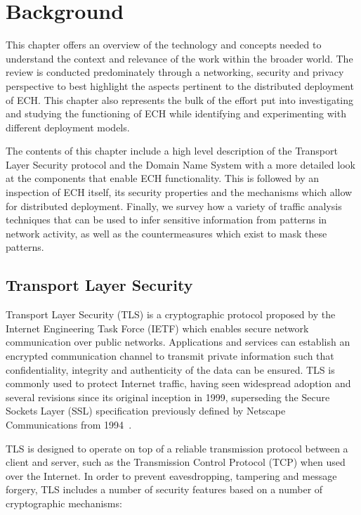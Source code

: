 \chapter{Background}\label{Background}

This chapter offers an overview of the technology and concepts needed to understand the context and relevance of the work within the broader world. The review is conducted predominately through a networking, security and privacy perspective to best highlight the aspects pertinent to the distributed deployment of ECH. This chapter also represents the bulk of the effort put into investigating and studying the functioning of ECH while identifying and experimenting with different deployment models.

The contents of this chapter include a high level description of the Transport Layer Security protocol and the Domain Name System with a more detailed look at the components that enable ECH functionality. This is followed by an inspection of ECH itself, its security properties and the mechanisms which allow for distributed deployment. Finally, we survey how a variety of traffic analysis techniques that can be used to infer sensitive information from patterns in network activity, as well as the countermeasures which exist to mask these patterns.








\section{Transport Layer Security}

Transport Layer Security (TLS) is a cryptographic protocol proposed by the Internet Engineering Task Force (IETF) which enables secure network communication over public networks. Applications and services can establish an encrypted communication channel to transmit private information such that confidentiality, integrity and authenticity of the data can be ensured. TLS is commonly used to protect Internet traffic, having seen widespread adoption and several revisions since its original inception in 1999, superseding the Secure Sockets Layer (SSL) specification previously defined by Netscape Communications from 1994~\cite{chan2018monitoring, LE-HTTPS, rfc2246}.

TLS is designed to operate on top of a reliable transmission protocol between a client and server, such as the Transmission Control Protocol (TCP) when used over the Internet. In order to prevent eavesdropping, tampering and message forgery, TLS includes a number of security features based on a number of cryptographic mechanisms:

